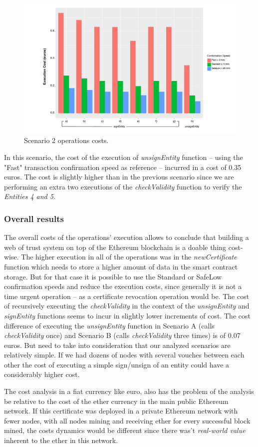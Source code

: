 \begin{figure}[htb]
  \centering
  \includegraphics[scale=0.5]{Figures/evaluation/wot-scenario2.pdf}
  \caption{Scenario 2 operations costs.}
\label{fig:scenario2-operation-cost}
\end{figure}

In this scenario, the cost of the execution of \textit{unsignEntity} function – using the "Fast" transaction confirmation speed as reference – incurred in a cost of 0.35 euros.
The cost is slightly higher than in the previous scenario since we are performing an extra two executions of the \textit{checkValidity} function to verify the \textit{Entities 4 and 5}.

\subsubsection{Overall results}

The overall costs of the operations' execution allows to conclude that building a web of trust system on top of the Ethereum blockchain is a doable thing cost-wise.
The higher execution in all of the operations was in the \textit{newCertificate} function which needs to store a higher amount of data in the smart contract storage. But for that case it is possible to use the Standard or SafeLow confirmation speeds and reduce the execution costs, since generally it is not a time urgent operation – as a certificate revocation operation would be.
The cost of recursively executing the \textit{checkValidity} in the context of the \textit{unsignEntity} and \textit{signEntity} functions seems to incur in slightly lower increments of cost. The cost difference of executing the \textit{unsignEntity} function in Scenario A (calls \textit{checkValidity} once) and Scenario B (calls \textit{checkValidity} three times) is of 0.07 euros. But need to take into consideration that our analyzed scenarios are relatively simple. If we had dozens of nodes with several vouches between each other the cost of executing a simple sign/unsign of an entity could have a considerably higher cost.

The cost analysis in a fiat currency like euro, also has the problem of the analysis be relative to the cost of the ether currency in the main public Ethereum network.
If this certificate was deployed in a private Ethereum network with fewer nodes, with all nodes mining and receiving ether for every successful block mined, the costs dynamics would be different since there was't \textit{real-world value} inherent to the ether in this network.
